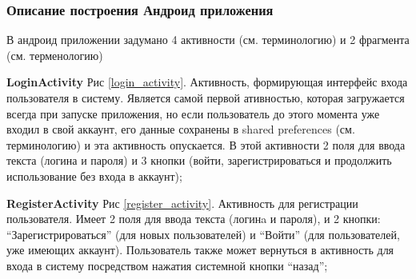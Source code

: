 \subsubsection{Описание построения Андроид приложения}
В андроид приложении задумано 4 активности (см. терминологию) и 2 фрагмента (см. терменологию)\\
\begin{my_enumerate}
    \item \textbf{LoginActivity} Рис \ref{login_activity}. Активность,
        формирующая интерфейс входа пользователя в систему. Является самой
        первой ативностью, которая загружается всегда при запуске приложения,
        но если пользователь до этого момента уже входил в свой аккаунт, его
        данные сохранены в shared preferences (см. терминологию) и эта
        активность опускается. В этой активности 2 поля для ввода текста
        (логина и пароля) и 3 кнопки (войти, зарегистрироваться и продолжить
        использование без входа в аккаунт);
    \item \textbf{RegisterActivity} Рис \ref{register_activity}.  Активность
        для регистрации пользователя.  Имеет 2 поля для ввода текста (логинa и
        пароля), и 2 кнопки: ``Зарегистрироваться'' (для новых пользователей) и
        ``Войти'' (для пользователей, уже имеющих аккаунт). Пользователь также
        может вернуться в активность для входа в систему посредством нажатия
        системной кнопки ``назад'';
        \begin{figure}[h!]
            \centering

\end{figure}
\end{my_enumerate}
